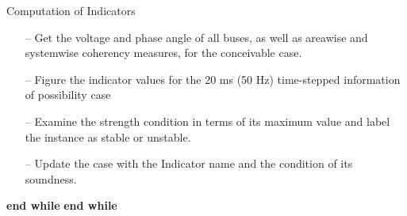 \begin{algorithm}[H]
\caption{Computation of Indicators}
\label{Computation of Indicators}
\begin{algorithmic}
\begin{itemize}
    \item[--] Get the voltage and phase angle of all buses, as well as areawise and systemwise coherency measures, for the conceivable case.
\end{itemize}
\begin{itemize}
    \item[--] Figure the indicator values for the 20 ms (50 Hz)
time-stepped information of possibility case
    \item[--] Examine the strength condition in terms of its maximum value and label the instance as stable or unstable.
    \item[--] Update the case with the Indicator name and the condition of its soundness.
\end{itemize}
\EndWhile
\State \textbf{end while}
\EndWhile
\State \textbf{end while}
\end{algorithmic}
\end{algorithm}